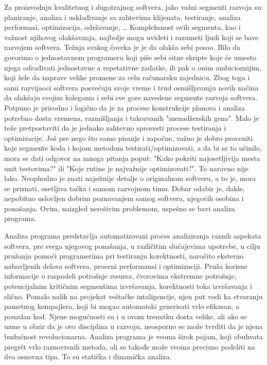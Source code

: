 \documentclass[12pt,oneside]{memoir}
\begin{document}
Za proizvodnju kvalitetnog i dugotrajnog softvera, jako važni segmenti razvoja su: planiranje, analiza i usklađivanje sa zahtevima klijenata, testiranje, analiza performasi, optimizacija, održavanje, … Kompleksnost ovih segmenta, kao i važnost njihovog olakšavanja, najbolje mogu uvideti i razumeti ljudi koji se bave razvojem softvera. Težnja svakog čoveka je je da olakša sebi posao. Bilo da govorimo o jednostavnom programeru koji piše sebi sitne skripte koje će umesto njega odrađivati jednostavne a repetativne zadatke, ili pak o onim ambicioznijim, koji žele da naprave velike promene za celu računarsku zajednicu. Zbog toga i sami razvijaoci softvera posvećuju svoje vreme i trud osmišljavanju novih načina da olakšaju svojim kolegama i sebi sve gore navedene segmente razvoja softvera. Potpuno je prirodno i logično da je za procese konstrukcije planova i analiza potrebno dosta vremena, razmišljanja i takozvanih "menadžerskih gena". Malo je teže pretpostaviti da je jednako zahtevno sprovesti procese testiranja i optimizacije. Još pre nego što samo pisanje i započne, važno je dobro proceniti koje segmente koda i kojom metodom testirati/optimizovati, a da bi se to učinilo, mora se dati odgovor na mnoga pitanja poput: "Kako pokriti najosetljivija mesta unit testovima?" ili "Koje rutine je najvažnije optimizovati?". To naravno nije lako. Neophodno je znati najsitnije detalje o originalnom softveru, a to je, mora se priznati, osetljiva tačka i samom razvojnom timu. Dobar odabir je, dakle, nepobitno uslovljen dobrim poznavanjem samog softvera, njegovih osobina i ponašanja. Ovim, naizgled nerešivim problemom, uspešno se bavi analiza programa.


Analiza programa predstavlja automatizovani proces analiziranja raznih aspekata softvera, pre svega njegovog ponašanja, u različitim slučajevima upotrebe, u cilju pružanja pomoći programerima pri testiranju korektnosti, naročito eksterno nabavljenih delova softvera, proceni performansi i optimizaciji. Pruža korisne informacije o raspodeli potrošnje resursa, čvorovima ekstremne potrošnje, potencijalnim kritičnim segmentima izvršavanja, korektnosti toka izvršavanja i slično. Pomalo nalik na projekat veštačke intaligencije, njen put vodi ka stvaranju pametnog kompajlera, koji bi mogao automatski generisati vrlo efikasan, a pouzdan kod. Njene mogućnosti su i u ovom trenutku dosta velike, ali ako se uzme u obzir da je ovo disciplina u razvoju, neosporno se može tvrditi da je njena budućnost revolucionarna. Analiza programa je veoma širok pojam, koji obuhvata pregršt vrlo raznovrsnih metoda, ali se takođe može veoma precizno podeliti na dva osnovna tipa. To su statička i dinamička analiza.
\end{document}
